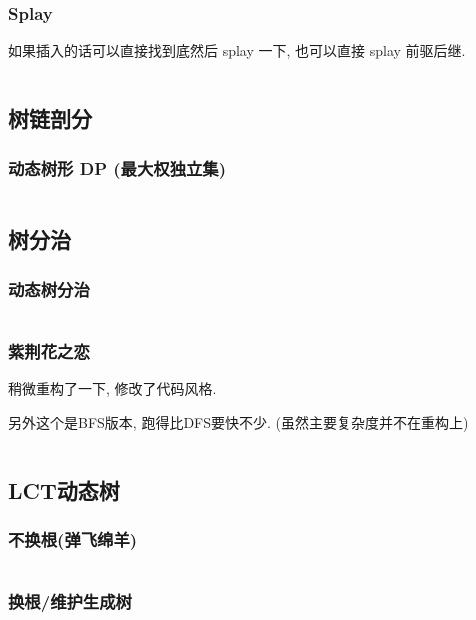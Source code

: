 \documentclass[a4paper, twoside]{article}
\begin{document}
\begin{multicols}{2}
				\subsubsection{Splay}
					如果插入的话可以直接找到底然后 splay 一下, 也可以直接 splay 前驱后继.
					\inputminted{cpp}{../src/datastructure/文艺平衡树.cpp}
				
			\subsection{树链剖分}
				\subsubsection{动态树形 DP (最大权独立集)}
					\inputminted{cpp}{../src/datastructure/动态树形DP.cpp}
				
			\subsection{树分治}

				
				\subsubsection{动态树分治}
					\inputminted{cpp}{../src/datastructure/动态树分治.cpp}

				\subsubsection{紫荆花之恋}
					稍微重构了一下, 修改了代码风格.

					另外这个是BFS版本, 跑得比DFS要快不少. (虽然主要复杂度并不在重构上)
					\inputminted{cpp}{../src/datastructure/紫荆花之恋.cpp}
	
			\subsection{LCT动态树}
				\subsubsection{不换根(弹飞绵羊)}
					\inputminted{cpp}{../src/datastructure/LCT(不换根).cpp}
			
				\subsubsection{换根/维护生成树}
					\inputminted{cpp}{../src/datastructure/LCT(换根).cpp}


\end{multicols}
\end{document}
